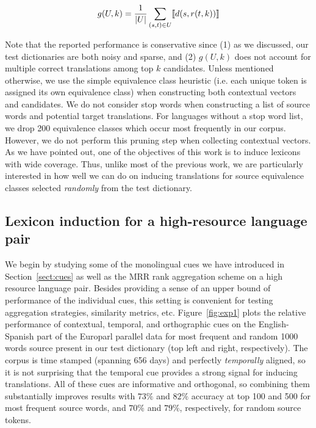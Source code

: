 \documentclass{article}
\newcommand{\secref}[1]{Section~\ref{#1}}
\newcommand{\figref}[1]{Figure~\ref{#1}}
\begin{document}
\begin{equation}
  g(U, k) = {1 \over |U|}\sum_{(s,t) \in U} \llbracket d(s, r(t, k))\rrbracket
\end{equation}

Note that the reported performance is conservative since (1) as we discussed, our test dictionaries are both noisy and sparse, and (2) $g(U, k)$ does not account for multiple correct translations among top $k$ candidates. Unless mentioned otherwise, we use the simple equivalence class heuristic (i.e. each unique token is assigned its own equivalence class) when constructing both contextual vectors and candidates.  We do not consider stop words when constructing a list of source words and potential target translations.  For languages without a stop word list, we drop 200 equivalence classes which occur most frequently in our corpus.  However, we do not perform this pruning step when collecting contextual vectors. \\

As we have pointed out, one of the objectives of this work is to induce lexicons with wide coverage.  Thus, unlike most of the previous work, we are particularly interested in how well we can do on inducing translations for source equivalence classes selected \emph{randomly} from the test dictionary.

\subsection{Lexicon induction for a high-resource language pair} \label{sect:exphigh}

We begin by studying some of the monolingual cues we have introduced in \secref{sect:cues} as well as the MRR rank aggregation scheme on a high resource language pair.  Besides providing a sense of an upper bound of performance of the individual cues, this setting is convenient for testing aggregation strategies, similarity metrics, etc.  \figref{fig:exp1} plots the relative performance of contextual, temporal, and orthographic cues on the English-Spanish part of the Europarl parallel data for most frequent and random 1000 words source present in our test dictionary (top left and right, respectively).  The corpus is time stamped (spanning 656 days) and perfectly \emph{temporally} aligned, so it is not surprising that the temporal cue provides a strong signal for inducing translations.  All of these cues are informative and orthogonal, so combining them substantially improves results with $73\%$ and  $82\%$ accuracy at top 100 and 500 for most frequent source words, and $70\%$ and  $79\%$, respectively, for random source tokens.  \\
\end{document}

